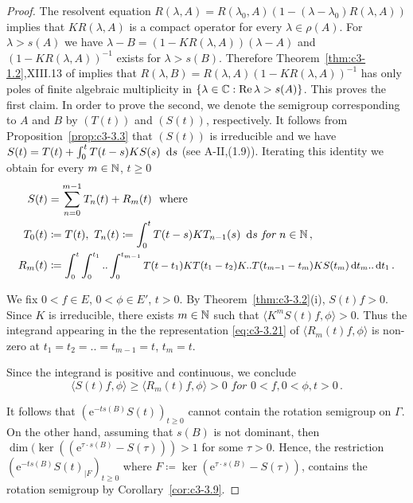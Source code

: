 \begin{proof}
	The resolvent equation $R(\lambda,A) = R(\lambda_{0},A)(1 - (\lambda-\lambda_{0})R(\lambda,A))$ implies that $KR(\lambda,A)$ is a compact operator for every $\lambda \in \rho(A)$. 
	For $\lambda > s(A)$ we have $\lambda - B = (1 - KR(\lambda,A))(\lambda-A)$ and $(1 - KR(\lambda,A))^{-1}$ exists for $\lambda > s(B)$.
	Therefore Theorem~\ref{thm:c3-1.2},XIII.13 of \citet{reedsimon:1979} 
	implies that $R(\lambda,B) = R(\lambda,A)(1 - KR(\lambda,A))^{-1}$ has only poles of finite algebraic multiplicity in $\{\lambda \in \mathbb{C}  : \mathop{}\!\mathrm{Re}\,\lambda > s(A)\}$. 
	This proves the first claim. 
	In order to prove the second, we denote the semigroup corresponding to $A$ and $B$ by $(T(t))$ and $(S(t))$,  respectively.
	It follows from Proposition~\ref{prop:c3-3.3} that $(S(t))$ is irreducible and we have $S(t) = T(t) + \int_{0}^{t} T(t-s)KS(s)~\mathop{}\!\mathrm{d}{s}$ (see A-II,(1.9)). 
	Iterating this identity we obtain for every $m \in \mathbb{N}$, $t \geq 0$
	\begin{equation}\label{eq:c3-3.21}
		\begin{aligned}
		S(t) &= \sum_{n=0}^{m-1} T_{n}(t) + R_{m}(t) \ \text{ where}\\
		T_{0}(t)&\coloneqq T(t),\  T_{n}(t) \coloneqq  \int_{0}^{t} T(t-s)KT_{n-1}(s)~\mathop{}\!\mathrm{d}{s} \textit{ for } n \in \mathbb{N}\,,\\
		R_{m}(t) &\coloneqq \textit{\small $\int_{0}^{t}\int_{0}^{t_{1}} .. \int_{0}^{t_{m-1}} T(t-t_{1})KT(t_{1}-t_{2})K .. T(t_{m-1}-t_m)KS(t_{m})\mathop{}\!\mathrm{d}{t} _{m}..\mathop{}\!\mathrm{d}{t} _{1}$}\,.
		\end{aligned}
	\end{equation} 
	
	We fix $0 < f \in E$, $0 < \phi \in E'$, $t > 0$. 
	By Theorem~\ref{thm:c3-3.2}(i), $S(t)f > 0$.
	Since $K$ is irreducible, there exists $m \in \mathbb{N}$ such that $\langle K^{m}S(t)f,\phi\rangle > 0$. 
	Thus the integrand appearing in the the representation \eqref{eq:c3-3.21} of $\langle R_{m}(t)f,\phi\rangle$ is non-zero at $t_{1}=t_{2}= .. =t_{m-1}=t$, $t_{m}= t$.
	
	Since the integrand is positive and continuous, we conclude
	\begin{equation}\label{eq:c3-3.22}
		\textit{$\langle S(t)f,\phi\rangle \geq \langle R_{m}(t)f,\phi\rangle > 0$ \ for \ $0 < f, 0 < \phi, t > 0$}\,.
	\end{equation}
	
	It follows that $(\mathrm{e}^{-ts(B)}S(t))_{t \geq 0}$ cannot contain the rotation semigroup on $\Gamma$. 
	On the other hand, assuming that $s(B)$ is not dominant, then $\dim(\ker((\mathrm{e}^{\tau\cdot s(B)} - S(\tau))) > 1$ for some $\tau > 0$. 
	Hence, the restriction $(\mathrm{e}^{-ts(B)}S(t)_{|F})_{t \geq 0}$ where $F \coloneqq  \ker(\mathrm{e}^{\tau\cdot s(B)}- S(\tau))$, contains the rotation semigroup by Corollary~\ref{cor:c3-3.9}.
\end{proof}

